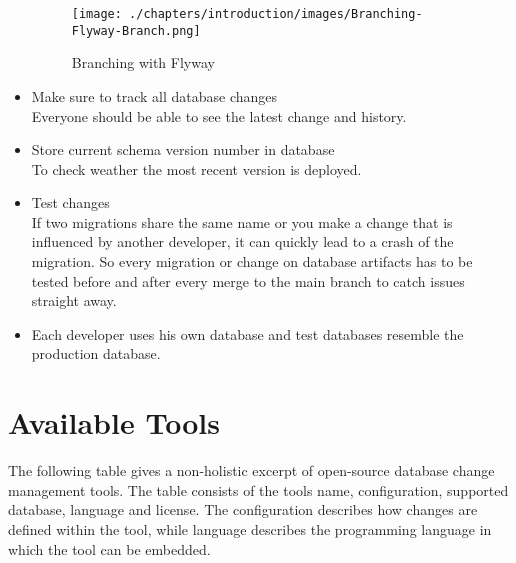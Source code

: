 \begin{itemize}
	\begin{figure}[H]
		\centering
		\texttt{[image: ./chapters/introduction/images/Branching-Flyway-Branch.png]}
		\caption[Branching with Flyway - Source: \cite{Lukonin2017}]{Branching with Flyway}
		\label{fig:flyway_branching}
	\end{figure}
	
	\item Make sure to track all database changes\\
	Everyone should be able to see the latest change and history.
	\item Store current schema version number in database\\
	To check weather the most recent version is deployed.
	\item Test changes\\
	If two migrations share the same name or you make a change that is influenced by another developer, it can quickly lead to a crash of the migration. So every migration or change on database artifacts has to be tested before and after every merge to the main branch to catch issues straight away.
	\item Each developer uses his own database and test databases resemble the production database.
\end{itemize}


\newpage
\section{Available Tools}%
The following table gives a non-holistic excerpt of open-source database change management tools. The table consists of the tools name, configuration, supported database, language and license. The configuration describes how changes are defined within the tool, while language describes the programming language in which the tool can be embedded.

